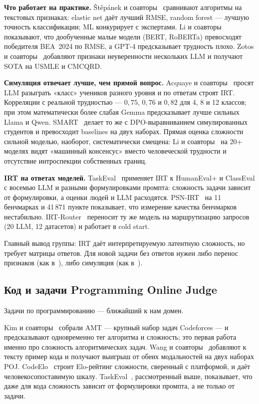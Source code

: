 \documentclass[11pt,a4paper]{article}
\begin{document}
\textbf{Что работает на практике.}
Štěpánek и соавторы~\cite{stepanek2023item} сравнивают алгоритмы на текстовых
признаках: elastic net даёт лучший RMSE, random forest — лучшую точность
классификации; ML конкурирует с экспертами. Li и
соавторы~\cite{li2025item} показывают, что дообученные малые модели
(BERT, RoBERTa) превосходят победителя BEA~2024 по RMSE, а GPT-4 предсказывает
трудность плохо. Zotos и соавторы~\cite{zotos2024doubtful} добавляют признаки
неуверенности нескольких LLM и получают SOTA на USMLE и CMCQRD.

\textbf{Симуляция отвечает лучше, чем прямой вопрос.}
Acquaye и соавторы~\cite{acquaye2026calculators} просят LLM разыграть
«класс» учеников разного уровня и по ответам строят IRT. Корреляции с реальной
трудностью — $0{,}75$, $0{,}76$ и $0{,}82$ для 4, 8 и 12 классов; при этом
математически более слабая Gemma предсказывает лучше сильных Llama и Qwen.
SMART~\cite{scarlatos2025smart} делает то же с DPO-выравниванием симулированных
студентов и превосходит baselines на двух наборах. Прямая оценка сложности
сильной моделью, наоборот, систематически смещена: Li и
соавторы~\cite{li2026struggles} на 20+ моделях видят «машинный консенсус»
вместо человеческой трудности и отсутствие интроспекции собственных границ.

\textbf{IRT на ответах моделей.}
TaskEval~\cite{tambon2026taskeval} применяет IRT к HumanEval+ и ClassEval с
восемью LLM и разными формулировками промпта: сложность задачи зависит от
формулировки, а оценки людей и LLM расходятся. PSN-IRT~\cite{zhou2025lost}
на 11 бенчмарках и 41\,871 пункте показывает, что измерение качества
бенчмарков нестабильно. IRT-Router~\cite{song2025irtrouter} переносит ту же
модель на маршрутизацию запросов (20 LLM, 12 датасетов) и работает в cold
start.

Главный вывод группы: IRT даёт интерпретируемую латентную сложность, но
требует матрицы ответов. Для новой задачи без ответов нужен либо перенос
признаков (как в~\cite{ge2026psychometrics}), либо симуляция (как
в~\cite{acquaye2026calculators,scarlatos2025smart}).

\subsection{Код и задачи Programming Online Judge}

Задачи по программированию — ближайший к нам домен.

Kim и соавторы~\cite{kim2023problem} собрали AMT — крупный набор задач
Codeforces — и предсказывают одновременно тег алгоритма и сложность; это
первая работа именно про сложность алгоритмических задач. Wang и
соавторы~\cite{wang2024estimating} добавляют к тексту пример кода и получают
выигрыш от обеих модальностей на двух наборах POJ. CodeElo~\cite{quan2025codeelo}
строит Elo-рейтинг сложности, сверенный с платформой, и даёт
человекосопоставимую шкалу. TaskEval~\cite{tambon2026taskeval}, рассмотренный
выше, показывает, что даже для кода сложность зависит от формулировки
промпта, а не только от задачи.
\end{document}
